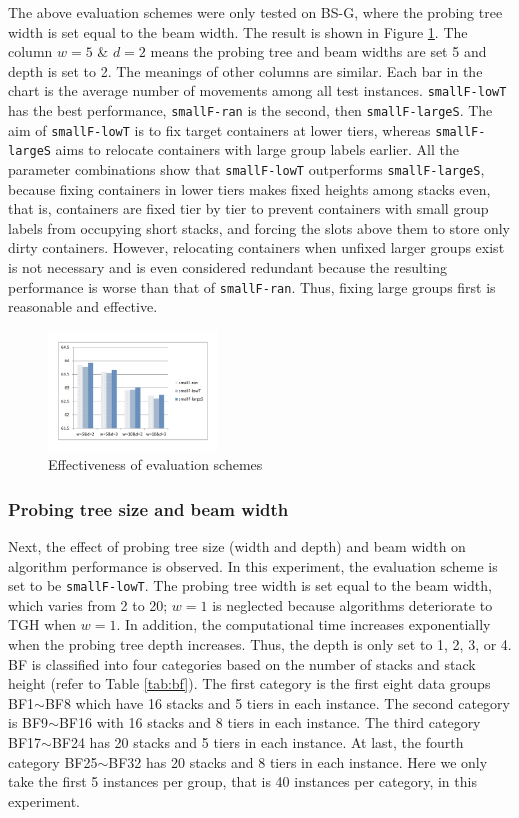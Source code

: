 \documentclass[review,3p,times,authoryear,12pt]{elsarticle}
\begin{document}
The above evaluation schemes were only tested on BS-G, where the probing tree width is set equal to the beam width. 
The result is shown in Figure \ref{fig7}. 
The column $w=5$ \& $d=2$ means the probing tree and beam widths are set 5 and depth is set to 2. 
The meanings of other columns are similar. 
Each bar in the chart is the average number of movements among all test instances. 
\texttt{smallF-lowT} has the best performance, \texttt{smallF-ran} is the second, then \texttt{smallF-largeS}. 
The aim of \texttt{smallF-lowT} is to fix target containers at lower tiers, whereas \texttt{smallF-largeS} aims to relocate containers with large group labels earlier. 
All the parameter combinations show that \texttt{smallF-lowT} outperforms \texttt{smallF-largeS}, because fixing containers in lower tiers makes fixed heights among stacks even, that is, containers are fixed tier by tier to prevent containers with small group labels from occupying short stacks, and forcing the slots above them to store only dirty containers. 
However, relocating containers when unfixed larger groups exist is not necessary and is even considered redundant because the resulting performance is worse than that of \texttt{smallF-ran}. 
Thus, fixing large groups first is reasonable and effective.

\begin{figure}[!htb]
\centering
\includegraphics[width=0.4\textwidth]{fig7.pdf}
\caption{Effectiveness of evaluation schemes}
\label{fig7}
\end{figure}

\subsubsection{Probing tree size and beam width}

Next, the effect of probing tree size (width and depth) and beam width on algorithm performance is observed. 
In this experiment, the evaluation scheme is set to be \texttt{smallF-lowT}. 
The probing tree width is set equal to the beam width, which varies from 2 to 20; $w=1$ is neglected because algorithms deteriorate to TGH when $w=1$. 
In addition, the computational time increases exponentially when the probing tree depth increases. 
Thus, the depth is only set to 1, 2, 3, or 4. 
BF is classified into four categories based on the number of stacks and stack height (refer to Table \ref{tab:bf}). 
The first category is the first eight data groups BF1$\sim$BF8 which have 16 stacks and 5 tiers in each instance. 
The second category is BF9$\sim$BF16 with 16 stacks and 8 tiers in each instance. 
The third category BF17$\sim$BF24 has 20 stacks and 5 tiers in each instance.
At last, the fourth category BF25$\sim$BF32 has 20 stacks and 8 tiers in each instance.
Here we only take the first 5 instances per group, that is 40 instances per category, in this experiment.
\end{document}
